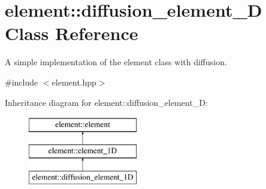 \hypertarget{classelement_1_1diffusion__element__1_d}{\section{element\-:\-:diffusion\-\_\-element\-\_\-D Class Reference}
\label{classelement_1_1diffusion__element__1_d}
}


A simple implementation of the element class with diffusion.  




{\ttfamily \#include $<$element.\-hpp$>$}

Inheritance diagram for element\-:\-:diffusion\-\_\-element\-\_\-D\-:\begin{figure}[H]
\begin{center}
\leavevmode
\includegraphics[height=3.000000cm]{classelement_1_1diffusion__element__1_d}
\end{center}
\end{figure}
